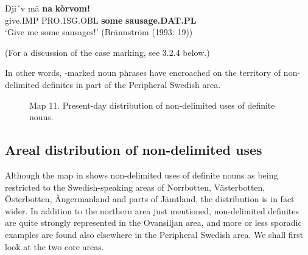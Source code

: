 \z

\item 


 \ea\label{}
\gll Dji´v  mä  \textbf{na}\textbf{  kòrvom!}\\


give.IMP  PRO.1SG.OBL  \textbf{some} \textbf{sausage.DAT.PL}\\

\glt ‘Give me some sausages!’ (Brännström (1993: 19))

\z

(For a discussion of the case marking, see 3.2.4 below.) 


In other words, -marked noun phrases have encroached on the territory of non-delimited definites in part of the Peripheral Swedish area. 


\begin{figure}[h]

\begin{minipage}{5.30556in}

Map 11. Present-day distribution of non-delimited uses of definite nouns.


\end{minipage}

\end{figure}

\subsection{\rmfamily Areal distribution of non-delimited uses}

Although the map in \citet{Delsing2003a} shows non-delimited uses of definite nouns as being restricted to the Swedish-speaking areas of Norrbotten, Västerbotten, Österbotten, Ångermanland and parts of Jämtland, the distribution is in fact wider. In addition to the northern area just mentioned, non-delimited definites are quite strongly represented in the Ovansiljan area, and more or less sporadic examples are found also elsewhere in the Peripheral Swedish area. We shall first look at the two core areas.

